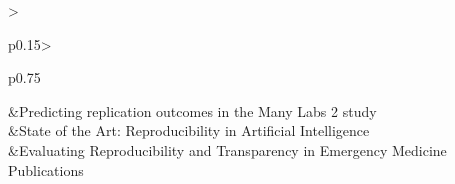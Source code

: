 \documentclass[12pt, a4paper, twocolumn]{article}
\begin{document}
\begin{table}[h!]
\begin{tabular}{>{\raggedright\arraybackslash}p{0.15\textwidth}>{\raggedright\arraybackslash}p{0.75\linewidth}}
	\citet{Forsell2019}  &Predicting replication outcomes in the Many Labs 2 study  \\
	\citet{gundersen2018state}  &State of the Art: Reproducibility in Artificial Intelligence \\
	\citet{Johnson2021Evaluating}  &Evaluating Reproducibility and Transparency in Emergency Medicine Publications \\
	\hline

	\end{tabular}
	\end{table}


	

	
\end{document}
